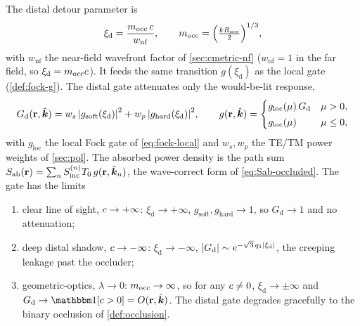 \begin{proposition}\label{prop:distal-xi}
The distal detour parameter is
\begin{equation}\label{eq:xi-distal}
  \xi_{\mathrm d} = \frac{m_{\mathrm{occ}}\,c}{w_{\mathrm{nf}}},
  \qquad
  m_{\mathrm{occ}} = \Bigl(\tfrac{kR_{\mathrm{occ}}}{2}\Bigr)^{1/3},
\end{equation}
with $w_{\mathrm{nf}}$ the near-field wavefront factor of \cref{sec:cmetric-nf}
($w_{\mathrm{nf}}=1$ in the far field, so $\xi_{\mathrm d}=m_{\mathrm{occ}}c$).
It feeds the same transition $g(\xi_{\mathrm d})$ as the local gate
(\cref{def:fock-g}). The distal gate attenuates only the would-be-lit response,
\begin{equation}\label{eq:distal-gate}
  G_{\mathrm d}(\mathbf{r},\hat{\bm{k}}) =
  w_s\,\abs{g_{\text{soft}}(\xi_{\mathrm d})}^2
  + w_p\,\abs{g_{\text{hard}}(\xi_{\mathrm d})}^2,
  \qquad
  g(\mathbf{r},\hat{\bm{k}}) = \begin{cases}
    g_{\mathrm{loc}}(\mu)\,G_{\mathrm d} & \mu>0,\\[2pt]
    g_{\mathrm{loc}}(\mu) & \mu\le0,
  \end{cases}
\end{equation}
with $g_{\mathrm{loc}}$ the local Fock gate of \cref{eq:fock-local} and $w_s,w_p$
the TE/TM power weights of \cref{sec:pol}. The absorbed power density is the
path sum $S_{\mathrm{ab}}(\mathbf{r})=\sum_nS_{\mathrm{inc}}^{(n)}T_0\,g(\mathbf{r},\hat{\bm{k}}_n)$, the wave-correct form
of \cref{eq:Sab-occluded}. The gate has the limits
\begin{enumerate}
  \item clear line of sight, $c\to+\infty$: $\xi_{\mathrm d}\to+\infty$,
    $g_{\text{soft}},g_{\text{hard}}\to1$, so $G_{\mathrm d}\to1$ and no
    attenuation;
  \item deep distal shadow, $c\to-\infty$: $\xi_{\mathrm d}\to-\infty$,
    $\abs{G_{\mathrm d}}\sim e^{-\sqrt3\,q_1\abs{\xi_{\mathrm d}}}$, the creeping
    leakage past the occluder;
  \item geometric-optics, $\lambda\to0$: $m_{\mathrm{occ}}\to\infty$, so for
    any $c\neq0$, $\xi_{\mathrm d}\to\pm\infty$ and
    $G_{\mathrm d}\to\ident[\clr>0]=O(\rr,\khat)$. The distal gate degrades
    gracefully to the binary occlusion of \cref{def:occlusion}.
\end{enumerate}
\end{proposition}

